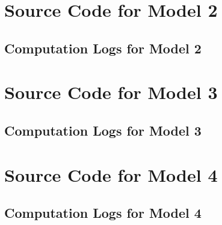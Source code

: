 \newpage
\section{Source Code for Model 2}


\begin{landscape}
    \section{Computation Logs for Model 2 }
    
\end{landscape}

\section{Source Code for Model 3}


\begin{landscape}
    \section{Computation Logs for Model 3}
    
\end{landscape}


\newpage
\section{Source Code for Model 4}


\begin{landscape}
    \section{Computation Logs for Model 4}
    
\end{landscape}

